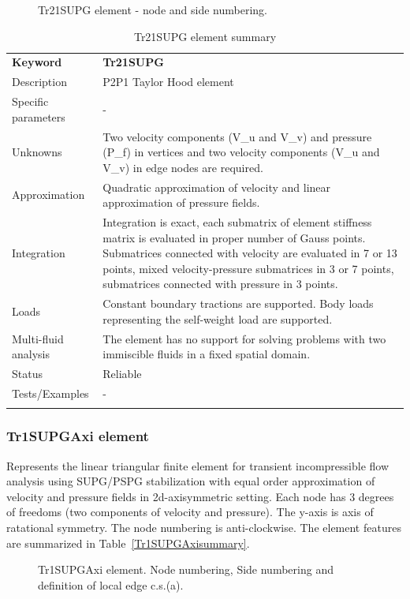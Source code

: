 \documentclass[a4paper]{article}
\newcommand{\templabel}{}%
\newcommand{\tempcaption}{}%
\newcounter{nelpar}
\newenvironment{elementsummary}[5]{%
  \gdef\tempcaption{#4}%
  \gdef\templabel{#5}%
  \setcounter{nelpar}{0}%
  \begin{center} %
    \begin{table}[!htb] %
      \begin{tabular}{|l|p{9cm}|}\hline %
        {\bf Keyword} & \bf{#1}\\ %
        {Description} & {#2}\\ %
        {Specific parameters} & {#3}\\ \hline %
}{
  \\ \hline %
      \end{tabular}%
      \caption{\tempcaption}%
      \label{\templabel}%
    \end{table}%
  \end{center}%
}
\newcommand{\elementDescription}[2]{{#1} & {#2}\\}
\begin{document}
\begin{figure}[htb]
 \centering
 \begin{makeimage}
  
 \end{makeimage}
 \caption{Tr21SUPG element - node and side numbering.}
 \label{Tr21SUPGfig}
\end{figure}

\begin{elementsummary}{Tr21SUPG}{P2P1 Taylor Hood element}{-}{Tr21SUPG element summary}{Tr21SUPGsummary}
\elementDescription{Unknowns}{Two velocity components (V\_u and V\_v) and pressure (P\_f) in vertices and two velocity components (V\_u and V\_v) in edge nodes are required.}
\elementDescription{Approximation}{Quadratic approximation of velocity and linear approximation of pressure fields.}
\elementDescription{Integration}{Integration is exact, each submatrix of element stiffness matrix is evaluated in proper number of
Gauss points. Submatrices connected with velocity are evaluated in 7 or 13 points, mixed velocity-pressure
submatrices in 3 or 7 points, submatrices connected with pressure in 3 points.}
\elementDescription{Loads}{Constant boundary tractions are supported. Body loads
representing the self-weight load are supported.}
\elementDescription{Multi-fluid analysis}{The element has no support for solving
problems with two immiscible fluids in a fixed spatial domain.}
\elementDescription{Status}{Reliable}
\elementDescription{Tests/Examples}{-}
\end{elementsummary}


\subsubsection{Tr1SUPGAxi element}
\label{Tr1SUPGAxi}
Represents the linear triangular finite element for transient
incompressible flow analysis using SUPG/PSPG stabilization with equal order
approximation of velocity and pressure fields in 2d-axisymmetric setting. Each node has 3 degrees
of freedoms (two components of velocity and pressure). The y-axis is
axis of ratational symmetry. The node numbering is anti-clockwise. The element features are summarized in Table~\ref{Tr1SUPGAxisummary}.

\begin{figure}[htb]
 \centering
 \begin{makeimage}
  
 \end{makeimage}
 \caption{Tr1SUPGAxi element. Node numbering, Side numbering and
 definition of local edge c.s.(a).}
 \label{Tr1SUPGAxifig}
\end{figure}
\end{document}

